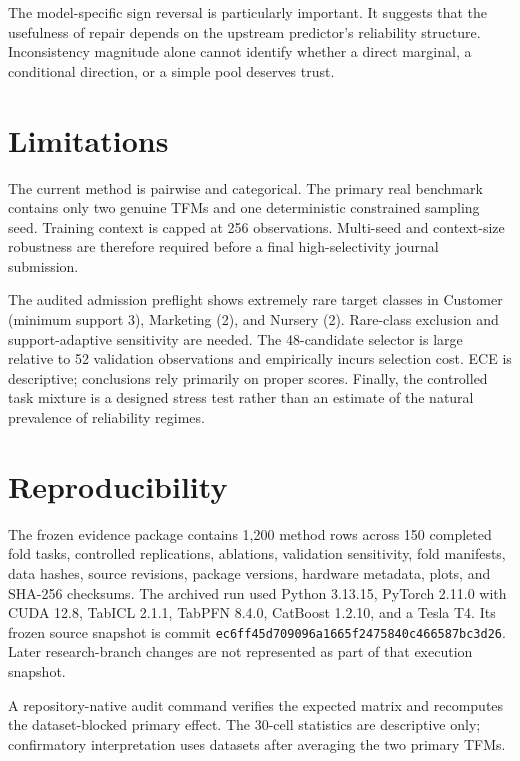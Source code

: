 \documentclass[pdflatex,sn-basic]{sn-jnl}
\theoremstyle{plain}
\begin{document}
The model-specific sign reversal is particularly important. It suggests that the usefulness of repair depends on the upstream predictor's reliability structure. Inconsistency magnitude alone cannot identify whether a direct marginal, a conditional direction, or a simple pool deserves trust.

\section{Limitations}\label{sec:limitations}
The current method is pairwise and categorical. The primary real benchmark contains only two genuine TFMs and one deterministic constrained sampling seed. Training context is capped at 256 observations. Multi-seed and context-size robustness are therefore required before a final high-selectivity journal submission.

The audited admission preflight shows extremely rare target classes in Customer (minimum support 3), Marketing (2), and Nursery (2). Rare-class exclusion and support-adaptive sensitivity are needed. The 48-candidate selector is large relative to 52 validation observations and empirically incurs selection cost. ECE is descriptive; conclusions rely primarily on proper scores. Finally, the controlled task mixture is a designed stress test rather than an estimate of the natural prevalence of reliability regimes.

\section{Reproducibility}\label{sec:repro}
The frozen evidence package contains 1,200 method rows across 150 completed fold tasks, controlled replications, ablations, validation sensitivity, fold manifests, data hashes, source revisions, package versions, hardware metadata, plots, and SHA-256 checksums. The archived run used Python 3.13.15, PyTorch 2.11.0 with CUDA 12.8, TabICL 2.1.1, TabPFN 8.4.0, CatBoost 1.2.10, and a Tesla T4. Its frozen source snapshot is commit \texttt{ec6ff45d709096a1665f2475840c466587bc3d26}. Later research-branch changes are not represented as part of that execution snapshot.

A repository-native audit command verifies the expected matrix and recomputes the dataset-blocked primary effect. The 30-cell statistics are descriptive only; confirmatory interpretation uses datasets after averaging the two primary TFMs.
\end{document}
